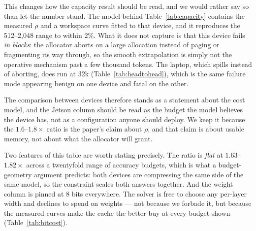 \documentclass[5p]{elsarticle}
\newcommand{\rhoSym}{\rho}
\begin{document}
This changes how the capacity result should be read, and we would rather say so
than let the number stand. The model behind Table~\ref{tab:capacity} contains the
measured $\rhoSym$ and a workspace curve fitted to that device, and it reproduces
the 512--2{,}048 range to within $2\%$. What it does not capture is that this
device fails \emph{in blocks}: the allocator aborts on a large allocation instead
of paging or fragmenting its way through, so the smooth extrapolation is simply
not the operative mechanism past a few thousand tokens. The laptop, which spills
instead of aborting, does run at 32k (Table~\ref{tab:headtohead}), which is the
same failure mode appearing benign on one device and fatal on the other.

The comparison between devices therefore stands as a statement about the cost
model, and the Jetson column should be read as the budget the model believes the
device has, not as a configuration anyone should deploy. We keep it because the
$1.6$--$1.8\times$ ratio is the paper's claim about $\rhoSym$, and that claim is
about usable memory, not about what the allocator will grant.

Two features of this table are worth stating precisely. The ratio is
\emph{flat} at $1.63$--$1.82\times$ across a twentyfold range of accuracy budgets,
which is what a budget-geometry argument predicts: both devices are compressing
the same side of the same model, so the constraint scales both answers together.
And the weight column is pinned at 8 bits everywhere. The solver is free to
choose any per-layer width and declines to spend on weights --- not because we
forbade it, but because the measured curves make the cache the better buy at
every budget shown (Table~\ref{tab:bitcost}).
\end{document}
